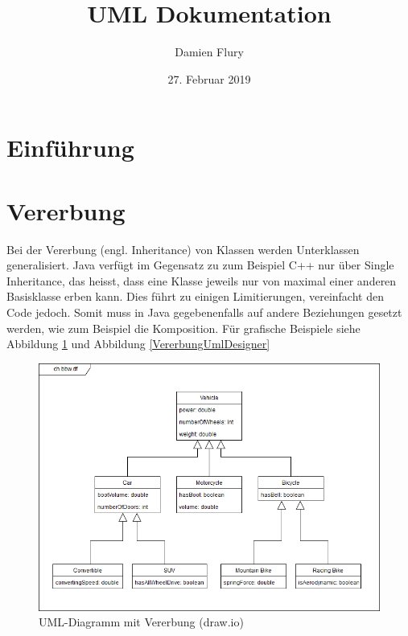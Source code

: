 \documentclass[a4paper, titlepage]{scrartcl}
\title{UML Dokumentation}
\author{Damien Flury}
\date{27. Februar 2019}
\begin{document}
    \maketitle
    \tableofcontents
    \newpage
    \section{Einführung}
    \section{Vererbung}
    Bei der Vererbung (engl. Inheritance) von Klassen werden Unterklassen generalisiert. Java
    verfügt im Gegensatz zu zum Beispiel C++ nur über Single Inheritance, das heisst, dass eine Klasse
    jeweils nur von maximal einer anderen Basisklasse erben kann. Dies führt zu einigen Limitierungen,
    vereinfacht den Code jedoch. Somit muss in Java gegebenenfalls auf andere Beziehungen gesetzt werden,
    wie zum Beispiel die Komposition. Für grafische Beispiele siehe Abbildung \ref{VererbungDrawIO}
    und Abbildung \ref{VererbungUmlDesigner}
    \begin{figure}
        \includegraphics[width=\textwidth]{Klassendiagramm1a}
        \caption{UML-Diagramm mit Vererbung (draw.io)}
        \label{VererbungDrawIO}
    \end{figure}
\end{document}

